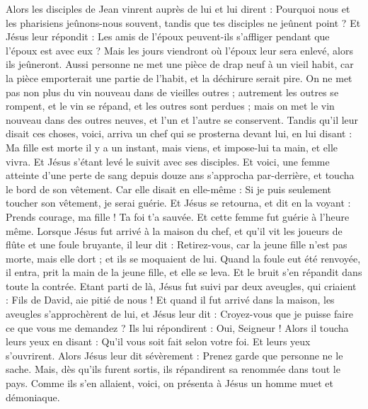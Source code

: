 \begin{multicols}{2}
Alors les disciples de Jean vinrent auprès de lui et lui dirent : Pourquoi nous et les pharisiens jeûnons-nous souvent, tandis que tes disciples ne jeûnent point ?
Et Jésus leur répondit : Les amis de l'époux peuvent-ils s'affliger pendant que l'époux est avec eux ? Mais les jours viendront où l'époux leur sera enlevé, alors ils jeûneront.
Aussi personne ne met une pièce de drap neuf à un vieil habit, car la pièce emporterait une partie de l'habit, et la déchirure serait pire.
On ne met pas non plus du vin nouveau dans de vieilles outres ; autrement les outres se rompent, et le vin se répand, et les outres sont perdues ; mais on met le vin nouveau dans des outres neuves, et l'un et l'autre se conservent.
Tandis qu'il leur disait ces choses, voici, arriva un chef qui se prosterna devant lui, en lui disant : Ma fille est morte il y a un instant, mais viens, et impose-lui ta main, et elle vivra.
Et Jésus s'étant levé le suivit avec ses disciples.
Et voici, une femme atteinte d'une perte de sang depuis douze ans s'approcha par-derrière, et toucha le bord de son vêtement.
Car elle disait en elle-même : Si je puis seulement toucher son vêtement, je serai guérie.
Et Jésus se retourna, et dit en la voyant : Prends courage, ma fille ! Ta foi t'a sauvée. Et cette femme fut guérie à l'heure même.
Lorsque Jésus fut arrivé à la maison du chef, et qu'il vit les joueurs de flûte et une foule bruyante,
il leur dit : Retirez-vous, car la jeune fille n'est pas morte, mais elle dort ; et ils se moquaient de lui.
Quand la foule eut été renvoyée, il entra, prit la main de la jeune fille, et elle se leva.
Et le bruit s'en répandit dans toute la contrée.
Etant parti de là, Jésus fut suivi par deux aveugles, qui criaient : Fils de David, aie pitié de nous !
Et quand il fut arrivé dans la maison, les aveugles s'approchèrent de lui, et Jésus leur dit : Croyez-vous que je puisse faire ce que vous me demandez ? Ils lui répondirent : Oui, Seigneur !
Alors il toucha leurs yeux en disant : Qu'il vous soit fait selon votre foi.
Et leurs yeux s'ouvrirent. Alors Jésus leur dit sévèrement : Prenez garde que personne ne le sache.
Mais, dès qu'ils furent sortis, ils répandirent sa renommée dans tout le pays.
Comme ils s'en allaient, voici, on présenta à Jésus un homme muet et démoniaque.

\end{multicols}
